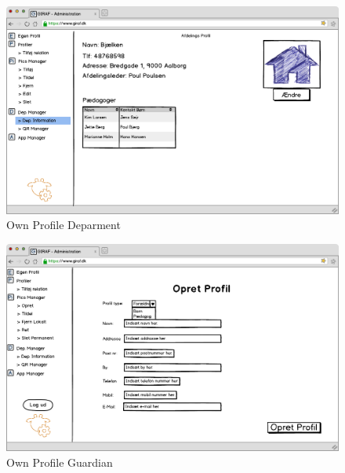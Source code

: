 \newpage

\begin{figure}[!h]
\centering
\includegraphics[width=1\textwidth]{images/mockup/egenProfilDepartment.png}
\caption{Own Profile Deparment}
\label{fig:own_profile_department}
\end{figure}

\begin{figure}[!h]
\centering
\includegraphics[width=1\textwidth]{images/mockup/egenProfilGaudiens.png}
\caption{Own Profile Guardian}
\label{fig:own_profile_guardian}
\end{figure}

\newpage

